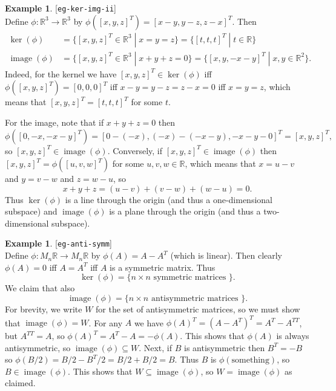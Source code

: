 \documentclass{amsart}
\newcommand{\lbl}[1]{\label{#1}\textup{[\texttt{#1}]}\ \\}
\newcommand{\lbl}{\label}
\newcommand{\R}         {{\mathbb{R}}}
\newcommand{\img}       {\operatorname{image}}
\newcommand{\sse}       {\subseteq}
\newcommand{\tm}        {\times}
\newcommand{\xra}       {\xrightarrow}
\newcommand{\st}        {\;|\;}
\renewcommand{\:}       {\colon}
\theoremstyle{definition}
\newtheorem{example}[theorem]{Example}
\begin{document}
\begin{example}\lbl{eg-ker-img-ii}
 Define $\phi\:\R^3\xra{}\R^3$ by
 $\phi([x,y,z]^T)=[x-y,y-z,z-x]^T$.  Then 
 \begin{align*}
  \ker(\phi) &=
    \{[x,y,z]^T\in\R^3\st x=y=z\} =
    \{[t,t,t]^T\st t\in\R\} \\
  \img(\phi) &= 
    \{[x,y,z]^T\in\R^3\st x+y+z=0\} =
    \{[x,y,-x-y]^T\st x,y\in\R^2\}.
 \end{align*}
 Indeed, for the kernel we have $[x,y,z]^T\in\ker(\phi)$ iff
 $\phi([x,y,z]^T)=[0,0,0]^T$ iff $x-y=y-z=z-x=0$ iff $x=y=z$, which
 means that $[x,y,z]^T=[t,t,t]^T$ for some $t$.

 For the image, note that if $x+y+z=0$ then
 \[ \phi([0,-x,-x-y]^T) = [0-(-x),(-x)-(-x-y),-x-y-0]^T = 
     [x,y,z]^T,
 \]
 so $[x,y,z]^T\in\img(\phi)$.  Conversely, if $[x,y,z]^T\in\img(\phi)$
 then $[x,y,z]^T=\phi([u,v,w]^T)$ for some $u,v,w\in\R$, which means
 that $x=u-v$ and $y=v-w$ and $z=w-u$, so 
 \[ x+y+z = (u-v)+(v-w)+(w-u) = 0. \]
 Thus $\ker(\phi)$ is a line through the origin (and thus a
 one-dimensional subspace) and $\img(\phi)$ is a plane
 through the origin (and thus a two-dimensional subspace).
\end{example}

\begin{example}\lbl{eg-anti-symm}
 Define $\phi\:M_n\R\xra{}M_n\R$ by $\phi(A)=A-A^T$ (which
 is linear).  Then clearly $\phi(A)=0$ iff $A=A^T$ iff $A$
 is a symmetric matrix.  Thus 
 \[ \ker(\phi)=\{n\tm n \text{ symmetric matrices }\}. \]
 We claim that also 
 \[ \img(\phi)=\{n\tm n \text{ antisymmetric matrices }\}. \]
 For brevity, we write $W$ for the set of antisymmetric
 matrices, so we must show that $\img(\phi)=W$.  For any $A$
 we have $\phi(A)^T=(A-A^T)^T=A^T-A^{TT}$, but $A^{TT}=A$, so
 $\phi(A)^T=A^T-A=-\phi(A)$.  This shows that $\phi(A)$ is
 always antisymmetric, so $\img(\phi)\sse W$.  Next, if $B$
 is antisymmetric then $B^T=-B$ so
 $\phi(B/2)=B/2-B^T/2=B/2+B/2=B$.  Thus $B$ is
 $\phi(\text{something})$, so $B\in\img(\phi)$.  This shows
 that $W\sse\img(\phi)$, so $W=\img(\phi)$ as claimed.  
\end{example}
\end{document}
